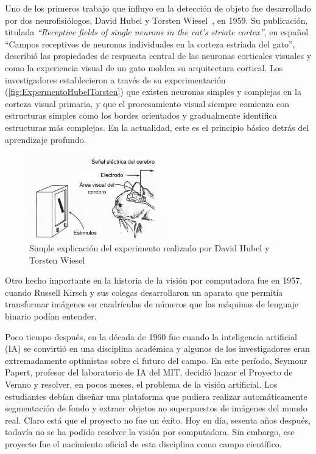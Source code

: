 Uno de los primeros trabajo que influyo en la detección de objeto fue desarrollado por dos neurofisiólogos, David Hubel y Torsten Wiesel~\cite{hubel1959receptive}, en 1959. Su publicación, titulada \textit{``Receptive fields of single neurons in the cat’s striate cortex''}, en español ``Campos receptivos de neuronas individuales en la corteza estriada del gato'', describió las propiedades de respuesta central de las neuronas corticales visuales y como la experiencia visual de un gato moldea su arquitectura cortical. Los investigadores establecieron a través de su experimentación (\autoref{fig:ExpermentoHubelTorsten}) que existen neuronas simples y complejas en la corteza visual primaria, y que el procesamiento visual siempre comienza con estructuras simples como los bordes orientados y gradualmente identifica estructuras más complejas. En la actualidad, este es el principio básico detrás del aprendizaje profundo.\\

\begin{figure}
	\centering
	\includegraphics[width=0.5\textwidth]{img/cat.jpg}
	\caption{Simple explicación del experimento realizado por David Hubel y Torsten Wiesel}
	\label{fig:ExpermentoHubelTorsten}
\end{figure}

Otro hecho importante en la historia de la visión por computadora fue en 1957, cuando Russell Kirsch y sus colegas desarrollaron un aparato que permitía transformar imágenes en cuadrículas de números que las máquinas de lenguaje binario podían entender. 

Poco tiempo después, en la década de 1960 fue cuando la inteligencia artificial (IA) se convirtió en una disciplina académica y algunos de los investigadores eran extremadamente optimistas sobre el futuro del campo. En este período, Seymour Papert, profesor del laboratorio de IA del MIT, decidió lanzar el Proyecto de Verano y resolver, en pocos meses, el problema de la visión artificial. Los estudiantes debían diseñar una plataforma que pudiera realizar automáticamente segmentación de fondo y extraer objetos no superpuestos de imágenes del mundo real. Claro está que el proyecto no fue un éxito.  Hoy en día, sesenta años después, todavía no se ha podido resolver la visión por computadora. Sin embargo, ese proyecto fue el nacimiento oficial de esta disciplina como campo científico. 

